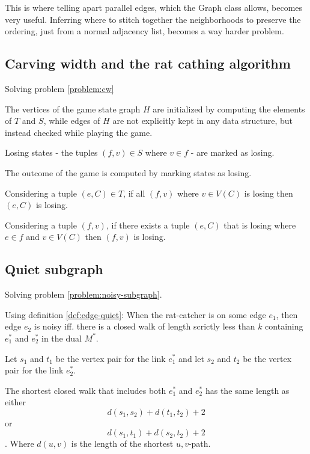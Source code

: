 \documentclass{article}
\begin{document}
		This is where telling apart parallel edges, which the Graph class allows, becomes very useful. Inferring where to stitch together the neighborhoods to preserve the ordering, just from a normal adjacency list, becomes a way harder problem.


	\subsection{Carving width and the rat cathing algorithm}\label{impl:cw}

		Solving problem \ref{problem:cw}

		The vertices of the game state graph $H$ are initialized by computing the elements of $T$ and $S$, while edges of $H$ are not explicitly kept in any data structure, but instead checked while playing the game.

		Losing states - the tuples $(f,v) \in S$ where $v \in f$ - are marked as losing.

		The outcome of the game is computed by marking states as losing.
		
		Considering a tuple $(e, C) \in T$, if all $(f, v)$ where $v \in V(C)$ is losing then $(e, C)$ is losing.

		Considering a tuple $(f, v)$, if there exists a tuple $(e, C)$ that is losing where $e \in f$ and $v \in V(C)$ then $(f, v)$ is losing.


	\subsection{Quiet subgraph}\label{impl:quiet}

		Solving problem \ref{problem:noisy-subgraph}.

		Using definition \ref{def:edge-quiet}: When the rat-catcher is on some edge $e_1$, then edge $e_2$ is noisy iff. there is a closed walk of length scrictly less than $k$ containing $e_1^*$ and $e_2^*$ in the dual $M^*$.

		Let $s_1$ and $t_1$ be the vertex pair for the link $e_1^*$ and let $s_2$ and $t_2$ be the vertex pair for the link $e_2^*$.

		\begin{claim}
			The shortest closed walk that includes both $e_1^*$ and $e_2^*$ has the same length as either $$d(s_1, s_2) + d(t_1, t_2) + 2$$ or $$d(s_1, t_1) + d(s_2, t_2) + 2$$. Where $d(u, v)$ is the length of the shortest $u,v$-path.
		\end{claim}
\end{document}
